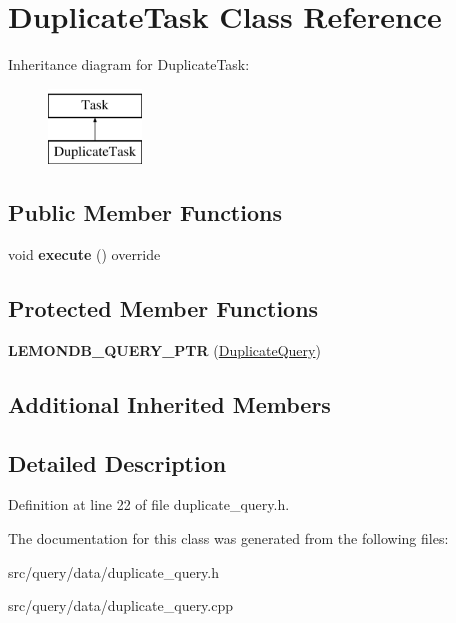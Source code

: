 \hypertarget{class_duplicate_task}{}\section{Duplicate\+Task Class Reference}
\label{class_duplicate_task}
Inheritance diagram for Duplicate\+Task\+:\begin{figure}[H]
\begin{center}
\leavevmode
\includegraphics[height=2.000000cm]{class_duplicate_task}
\end{center}
\end{figure}
\subsection*{Public Member Functions}
\begin{DoxyCompactItemize}
\item 
\mbox{\label{class_duplicate_task_a0163417206331d992839f28b8090b87c}} 
void {\bfseries execute} () override
\end{DoxyCompactItemize}
\subsection*{Protected Member Functions}
\begin{DoxyCompactItemize}
\item 
\mbox{\label{class_duplicate_task_a1dcec62cac0f05d33eb4bbd261889380}} 
{\bfseries L\+E\+M\+O\+N\+D\+B\+\_\+\+Q\+U\+E\+R\+Y\+\_\+\+P\+TR} (\hyperlink{class_duplicate_query}{Duplicate\+Query})
\end{DoxyCompactItemize}
\subsection*{Additional Inherited Members}


\subsection{Detailed Description}


Definition at line 22 of file duplicate\+\_\+query.\+h.



The documentation for this class was generated from the following files\+:\begin{DoxyCompactItemize}
\item 
src/query/data/duplicate\+\_\+query.\+h\item 
src/query/data/duplicate\+\_\+query.\+cpp\end{DoxyCompactItemize}
